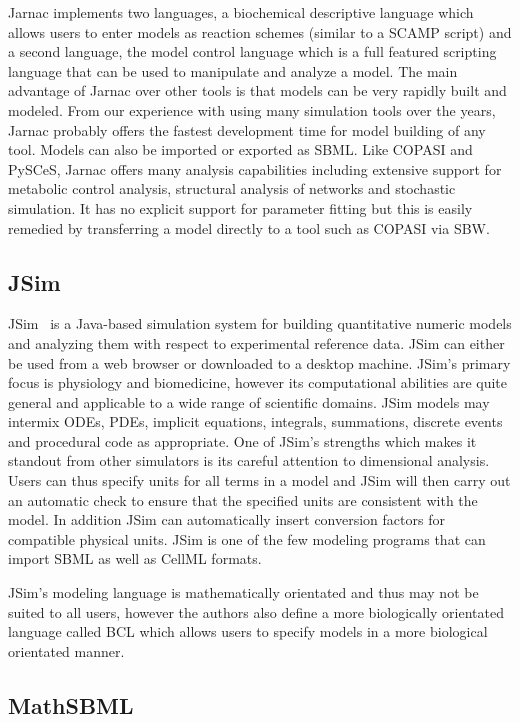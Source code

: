 \documentclass[12pt]{article}
\begin{document}
Jarnac implements two languages, a biochemical
descriptive language which allows users to enter models as reaction
schemes (similar to a SCAMP script) and a second language, the
model control language which is a full featured scripting language
that can be used to manipulate and analyze a model. The main
advantage of Jarnac over other tools is that models can be very
rapidly built and modeled. From our experience with using many
simulation tools over the years, Jarnac probably offers the fastest
development time for model building of any tool. Models can also be
imported or exported as SBML. Like COPASI and PySCeS, Jarnac offers
many analysis capabilities including extensive support for metabolic
control analysis, structural analysis of networks and stochastic
simulation. It has no explicit support for parameter fitting but
this is easily remedied by transferring a model directly to a tool
such as COPASI via SBW.

\subsection{JSim}

JSim~\citep{JSim:2003} is a Java-based simulation system for building
quantitative numeric models and analyzing them with respect to
experimental reference data. JSim can either be used from a web
browser or downloaded to a desktop machine. JSim's primary focus
is physiology and biomedicine, however its computational abilities
are quite general and applicable to a wide range of scientific
domains. JSim models may intermix ODEs, PDEs, implicit equations,
integrals, summations, discrete events and procedural code as
appropriate. One of JSim's strengths which makes it standout from
other simulators is its careful attention to dimensional analysis.
Users can thus specify units for all terms in a model and JSim will
then carry out an automatic check to ensure that the specified units
are consistent with the model. In addition JSim can automatically
insert conversion factors for compatible physical units. JSim is one
of the few modeling programs that can import SBML as well as CellML
formats.

JSim's modeling language is mathematically orientated and thus may not be suited to all users, however the authors also define a more biologically orientated language called BCL which allows users to specify models in a more biological orientated manner.

\subsection{MathSBML}
\end{document}
